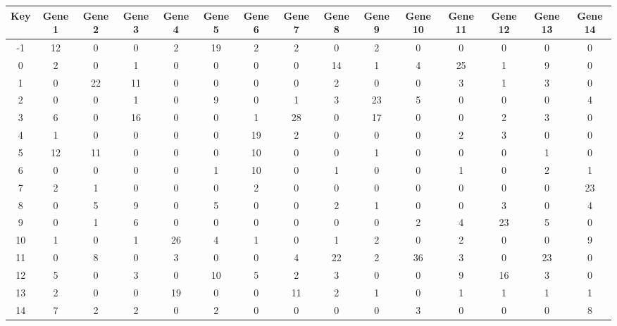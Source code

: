 \begin{tabular}{|c|c|c|c|c|c|c|c|c|c|c|c|c|c|c|}
\hline
Key & Gene 1 & Gene 2 & Gene 3 & Gene 4 & Gene 5 & Gene 6 & Gene 7 & Gene 8 & Gene 9 & Gene 10 & Gene 11 & Gene 12 & Gene 13 & Gene 14 \\
\hline
-1 & 12 & 0 & 0 & 2 & 19 & 2 & 2 & 0 & 2 & 0 & 0 & 0 & 0 & 0 \\
0 & 2 & 0 & 1 & 0 & 0 & 0 & 0 & 14 & 1 & 4 & 25 & 1 & 9 & 0 \\
1 & 0 & 22 & 11 & 0 & 0 & 0 & 0 & 2 & 0 & 0 & 3 & 1 & 3 & 0 \\
2 & 0 & 0 & 1 & 0 & 9 & 0 & 1 & 3 & 23 & 5 & 0 & 0 & 0 & 4 \\
3 & 6 & 0 & 16 & 0 & 0 & 1 & 28 & 0 & 17 & 0 & 0 & 2 & 3 & 0 \\
4 & 1 & 0 & 0 & 0 & 0 & 19 & 2 & 0 & 0 & 0 & 2 & 3 & 0 & 0 \\
5 & 12 & 11 & 0 & 0 & 0 & 10 & 0 & 0 & 1 & 0 & 0 & 0 & 1 & 0 \\
6 & 0 & 0 & 0 & 0 & 1 & 10 & 0 & 1 & 0 & 0 & 1 & 0 & 2 & 1 \\
7 & 2 & 1 & 0 & 0 & 0 & 2 & 0 & 0 & 0 & 0 & 0 & 0 & 0 & 23 \\
8 & 0 & 5 & 9 & 0 & 5 & 0 & 0 & 2 & 1 & 0 & 0 & 3 & 0 & 4 \\
9 & 0 & 1 & 6 & 0 & 0 & 0 & 0 & 0 & 0 & 2 & 4 & 23 & 5 & 0 \\
10 & 1 & 0 & 1 & 26 & 4 & 1 & 0 & 1 & 2 & 0 & 2 & 0 & 0 & 9 \\
11 & 0 & 8 & 0 & 3 & 0 & 0 & 4 & 22 & 2 & 36 & 3 & 0 & 23 & 0 \\
12 & 5 & 0 & 3 & 0 & 10 & 5 & 2 & 3 & 0 & 0 & 9 & 16 & 3 & 0 \\
13 & 2 & 0 & 0 & 19 & 0 & 0 & 11 & 2 & 1 & 0 & 1 & 1 & 1 & 1 \\
14 & 7 & 2 & 2 & 0 & 2 & 0 & 0 & 0 & 0 & 3 & 0 & 0 & 0 & 8 \\
\hline
\end{tabular}